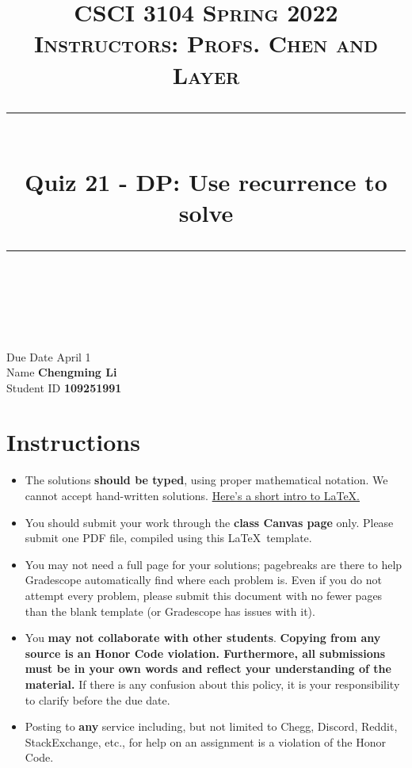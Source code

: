 \documentclass[11pt]{article}
\title{
\normalfont \normalsize 
\textsc{CSCI 3104 Spring 2022 \\ 
Instructors: Profs. Chen and Layer} \\
[10pt] 
\rule{\linewidth}{0.5pt} \\[6pt] 
\huge Quiz 21 - DP: Use recurrence to solve \\
\rule{\linewidth}{2pt}  \\[10pt]
}
\date{}
\theoremstyle{definition}
\theoremstyle{definition}
\theoremstyle{definition}
\begin{document}

\maketitle


\noindent
Due Date \dotfill April 1 \\
Name \dotfill \textbf{Chengming Li} \\
Student ID \dotfill \textbf{109251991} \\


\tableofcontents

\section{Instructions}
 \begin{itemize}
	\item The solutions \textbf{should be typed}, using proper mathematical notation. We cannot accept hand-written solutions. \href{http://ece.uprm.edu/~caceros/latex/introduction.pdf}{Here's a short intro to \LaTeX.}
	\item You should submit your work through the \textbf{class Canvas page} only. Please submit one PDF file, compiled using this \LaTeX \ template.
	\item You may not need a full page for your solutions; pagebreaks are there to help Gradescope automatically find where each problem is. Even if you do not attempt every problem, please submit this document with no fewer pages than the blank template (or Gradescope has issues with it).

	\item You \textbf{may not collaborate with other students}. \textbf{Copying from any source is an Honor Code violation. Furthermore, all submissions must be in your own words and reflect your understanding of the material.} If there is any confusion about this policy, it is your responsibility to clarify before the due date. 

	\item Posting to \textbf{any} service including, but not limited to Chegg, Discord, Reddit, StackExchange, etc., for help on an assignment is a violation of the Honor Code.

\end{itemize}
\end{document}
